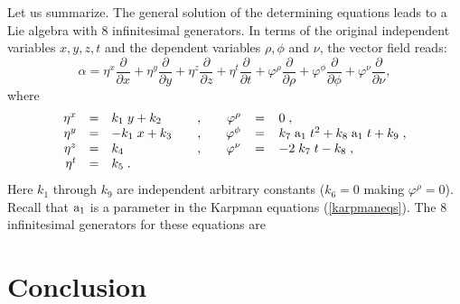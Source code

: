 {\nopagebreak
Let us summarize. The general solution of the determining equations leads
to a Lie algebra with 8 infinitesimal generators. In terms of the original 
independent variables $x, y, z, t$ and the dependent variables $\rho, \phi $ 
and $\nu$, the vector field reads:
\begin{equation}
\alpha = \eta^{x} \frac{\partial}{\partial x}
+ \eta^{y} \frac{\partial}{\partial y}
+ \eta^{z} \frac{\partial}{\partial z}
+ \eta^{t} \frac{\partial}{\partial t}
+ \varphi^\rho \frac{\partial}{\partial \rho}
+ \varphi^\phi  \frac{\partial}{\partial \phi}
+ \varphi^\nu  \frac{\partial}{\partial \nu} ,
\label{coefvectorfield}
\end{equation}
\pagebreak
\noindent
where
\begin{equation}
\begin{array}{rclcrcl}
\eta^{x} & = & k_1 \; y + k_2 & \quad , \quad & \varphi^{\rho} & = & 0 \; , \\
\eta^{y} & = & - k_1 \; x + k_3 & \quad ,  \quad
& \varphi^{\phi} & = & k_7 \; {\rm a_1} \; t^2 +  k_8 \; {\rm a_1} \; t 
+ k_9 \; ,\\
\eta^{z} & = & k_4 &\quad ,\quad 
& \varphi^{\nu} & = & - 2 \; k_7 \;t - k_8 \; , \\
\eta^{t} & = & k_5 \; . &\quad \quad & \quad & \quad & \quad 
\end{array}
\end{equation}
\nopagebreak
\noindent
Here $k_1$ through $k_9$ are independent arbitrary constants ($k_6 = 0$
making $\varphi^{\rho} = 0 $).
Recall that  ${\rm a_1}$ is a parameter in the Karpman equations 
(\ref{karpmaneqs}).
The 8 infinitesimal generators for these equations are 

\section{Conclusion}

}
